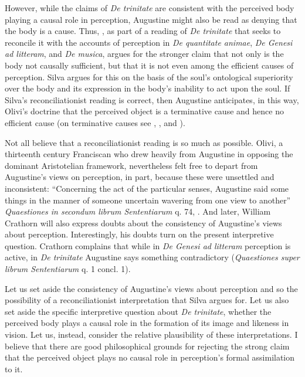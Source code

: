 \documentclass[12pt]{article}
\begin{document}
However, while the claims of \emph{De trinitate} are consistent with the perceived body playing a causal role in perception, Augustine might also be read as denying that the body is a cause. Thus, \citealt{Silva:2014bh}, as part of a reading of \emph{De trinitate} that seeks to reconcile it with the accounts of perception in \emph{De quantitate animae}, \emph{De Genesi ad litteram}, and \emph{De musica}, argues for the stronger claim that not only is the body not causally sufficient, but that it is not even among the efficient causes of perception. Silva argues for this on the basis of the soul's ontological superiority over the body and its expression in the body's inability to act upon the soul. If Silva's \citeyearpar{Silva:2014bh} reconciliationist reading is correct, then Augustine anticipates, in this way, Olivi's doctrine that the perceived object is a terminative cause and hence no efficient cause (on terminative causes see \citealt[192--195]{Kent:1984zm}, \citealt[chapter 5.2]{Pasnau:1997aa}, and \citealt[chapter 6]{Toivanen:2013ul}).

Not all believe that a reconciliationist reading is so much as possible. Olivi, a thirteenth century Franciscan who drew heavily from Augustine in opposing the dominant Aristotelian framework, nevertheless felt free to depart from Augustine's views on perception, in part, because these were unsettled and inconsistent: ``Concerning the act of the particular senses, Augustine said some things in the manner of someone uncertain wavering from one view to another'' \emph{Quaestiones in secondum librum Sententiarum} q. 74, \citealt[131]{Pasnau:1997aa}. And later, William Crathorn will also express doubts about the consistency of Augustine's views about perception. Interestingly, his doubts turn on the present interpretive question. Crathorn complains that while in \emph{De Genesi ad litteram} perception is active, in \emph{De trinitate} Augustine says something contradictory (\emph{Quaestiones super librum Sententiarum} q. 1 concl. 1).

Let us set aside the consistency of Augustine's views about perception and so the possibility of a reconciliationist interpretation that Silva argues for. Let us also set aside the specific interpretive question about \emph{De trinitate}, whether the perceived body plays a causal role in the formation of its image and likeness in vision. Let us, instead, consider the relative plausibility of these interpretations.  I believe that there are good philosophical grounds for rejecting the strong claim that the perceived object plays no causal role in perception's formal assimilation to it.
\end{document}
